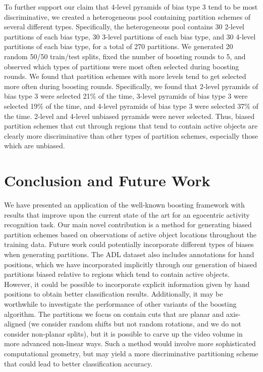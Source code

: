 \documentclass[10pt,twocolumn,letterpaper]{article}
\begin{document}
  To further support our claim that 4-level pyramids of bias type 3 tend to be most
  discriminative, we created a heterogeneous pool containing partition
  schemes of
  several different types. Specifically, the heterogeneous pool contains 30 2-level
  partitions of each bias type, 30 3-level partitions of each bias type, and
  30 4-level partitions of each bias type, for a total of 270 partitions.
  We generated 20 random 50/50 train/test splits, fixed the number of
  boosting rounds to 5, and observed which types of partitions were most
  often selected during boosting rounds.
  We found that partition schemes with more levels tend to get selected more
  often during boosting rounds.
  Specifically, we found that 2-level pyramids of bias type 3 were selected
  21\% of the time, 3-level pyramids of bias type 3 were selected 19\% of
  the time, and 4-level pyramids of bias type 3 were selected 37\% of the
  time. 2-level and 4-level unbiased pyramids were never selected. Thus,
  biased partition schemes that cut through regions that tend to contain
  active objects are clearly more discriminative than other types of
  partition schemes, especially those which are unbiased.
	
\section{Conclusion and Future Work}
	We have presented an application of the well-known boosting framework
	with results that improve upon the current state of the art for an
  egocentric activity recognition task.
	Our main novel contribution is a method for generating biased partition
	schemes based on observations of active object locations throughout the
  training data.
	Future work could potentially incorporate different types of biases when generating
	partitions. The ADL dataset also includes annotations for hand positions,
	which we have incorporated implicitly through our generation of biased partitions
	biased relative to regions which tend to contain active objects. However,
	it could be possible to incorporate explicit information given by hand
	positions to obtain better classification results.
	Additionally, it may be worthwhile to investigate the performance of other
	variants of the boosting algorithm.
	The partitions we focus on contain cuts that are
  planar and axis-aligned (we consider random shifts but not random
  rotations, and we do not consider non-planar splits),
  but it is possible to carve up the
	video volume in more advanced non-linear ways. Such a method would involve more
	sophisticated computational geometry, but may yield a more discriminative
	partitioning scheme that could lead to better classification accuracy.
  

{\small


}
\end{document}
